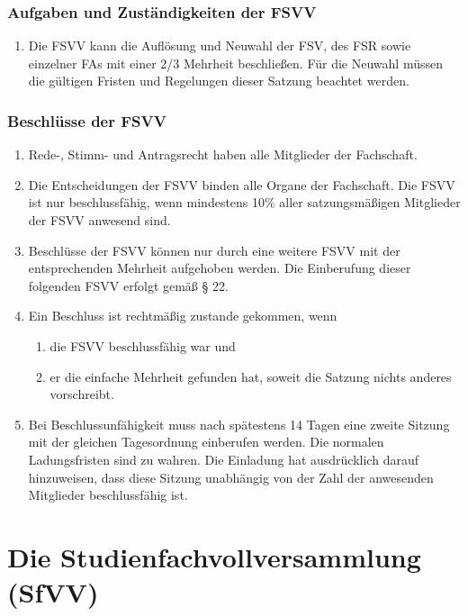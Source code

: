 \documentclass{article}
\providecommand{\tightlist}{\setlength{\itemsep}{0pt}\setlength{\parskip}{0pt}}
\begin{document}
\section{Aufgaben und Zuständigkeiten der FSVV}\label{aufgaben-und-zustuxe4ndigkeiten-der-fsvv}

\begin{enumerate}[(1)]
	\item Die FSVV kann die Auflösung und Neuwahl der FSV, des FSR sowie einzelner FAs mit einer 2/3 Mehrheit beschließen. Für die Neuwahl müssen die gültigen Fristen und Regelungen dieser Satzung beachtet werden.
\end{enumerate}

\section{Beschlüsse der FSVV}\label{beschluxfcsse-der-fsvv}

\begin{enumerate}[(1)]
	\item Rede-, Stimm- und Antragsrecht haben alle Mitglieder der Fachschaft.
	\item Die Entscheidungen der FSVV binden alle Organe der Fachschaft. Die FSVV ist nur beschlussfähig, wenn mindestens 10\% aller satzungsmäßigen Mitglieder der FSVV anwesend sind.
	\item Beschlüsse der FSVV können nur durch eine weitere FSVV mit der entsprechenden Mehrheit aufgehoben werden. Die Einberufung dieser folgenden FSVV erfolgt gemäß § 22.
	\item Ein Beschluss ist rechtmäßig zustande gekommen, wenn
	\begin{enumerate}[1.]
		\tightlist
		\item die FSVV beschlussfähig war und
		\item er die einfache Mehrheit gefunden hat, soweit die Satzung nichts anderes vorschreibt.
	\end{enumerate}
	\item Bei Beschlussunfähigkeit muss nach spätestens 14 Tagen eine zweite Sitzung mit der gleichen Tagesordnung einberufen werden. Die normalen Ladungsfristen sind zu wahren. Die Einladung hat ausdrücklich darauf hinzuweisen, dass diese Sitzung unabhängig von der Zahl der anwesenden Mitglieder beschlussfähig ist.
\end{enumerate}

\part{Die Studienfachvollversammlung (SfVV)}\label{iii.-die-studienfachvollversammlung-sfvv}
\end{document}
